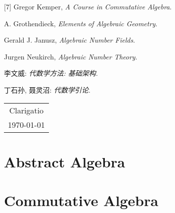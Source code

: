 \documentclass{article}
\begin{document}
[7] Gregor Kemper, \textit{A Course in Commutative Algebra}.\par
[8] A. Grothendieck, \textit{Elements of Algebraic Geometry}.\par
[9] Gerald J. Janusz, \textit{Algebraic Number Fields}.\par
[10] Jurgen Neukirch, \textit{Algebraic Number Theory}.\par
[8] 李文威: \textit{代数学方法: 基础架构}.\par
[9] 丁石孙, 聂灵沼: \textit{代数学引论}.
\begin{flushright}
    \begin{tabular}{c}
        Clarigatio\\
        \today
    \end{tabular}
\end{flushright}
\newpage
{}
\part{Abstract Algebra}
\newpage
\part{Commutative Algebra}

\newpage
\end{document}
